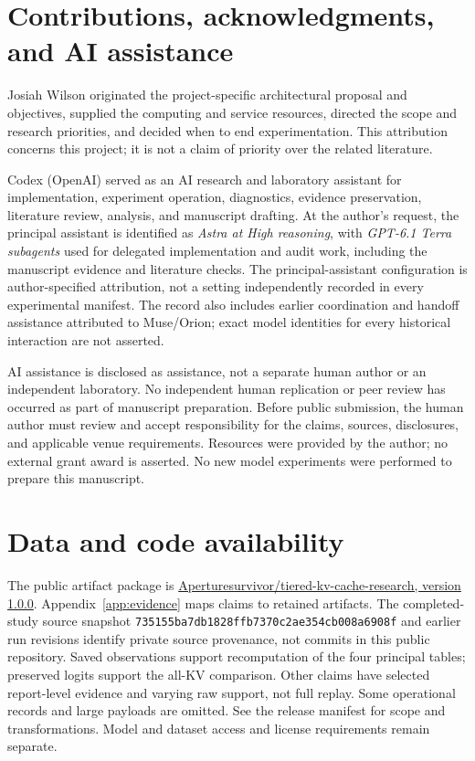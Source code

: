 \documentclass[11pt,letterpaper]{article}
\begin{document}
\section*{Contributions, acknowledgments, and AI assistance}
Josiah Wilson originated the project-specific architectural proposal and objectives, supplied the computing and service resources, directed the scope and research priorities, and decided when to end experimentation. This attribution concerns this project; it is not a claim of priority over the related literature.

Codex (OpenAI) served as an AI research and laboratory assistant for implementation, experiment operation, diagnostics, evidence preservation, literature review, analysis, and manuscript drafting. At the author's request, the principal assistant is identified as \emph{Astra at High reasoning}, with \emph{GPT-6.1 Terra subagents} used for delegated implementation and audit work, including the manuscript evidence and literature checks. The principal-assistant configuration is author-specified attribution, not a setting independently recorded in every experimental manifest. The record also includes earlier coordination and handoff assistance attributed to Muse/Orion; exact model identities for every historical interaction are not asserted.

AI assistance is disclosed as assistance, not a separate human author or an independent laboratory. No independent human replication or peer review has occurred as part of manuscript preparation. Before public submission, the human author must review and accept responsibility for the claims, sources, disclosures, and applicable venue requirements. Resources were provided by the author; no external grant award is asserted. No new model experiments were performed to prepare this manuscript.

\section*{Data and code availability}
The public artifact package is \href{https://github.com/Aperturesurvivor/tiered-kv-cache-research/tree/v1.0.0}{Aperturesurvivor/tiered-kv-cache-research, version 1.0.0}. Appendix~\ref{app:evidence} maps claims to retained artifacts. The completed-study source snapshot \texttt{735155ba7db1828ffb737\allowbreak 0c2ae354cb008a6908f} and earlier run revisions identify private source provenance, not commits in this public repository. Saved observations support recomputation of the four principal tables; preserved logits support the all-KV comparison. Other claims have selected report-level evidence and varying raw support, not full replay. Some operational records and large payloads are omitted. See the release manifest for scope and transformations. Model and dataset access and license requirements remain separate.
\end{document}
